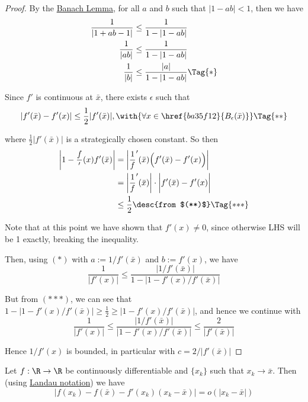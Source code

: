 \begin{proof}
  \def\A{f'(\bar x)}\def\B{f'(x)}

  By the \href{aa9e48d}{Banach Lemma}, for all $a$ and $b$ such that
  $|1-ab|<1$, then we have
  \begin{align*}
    \frac1{|1+ab-1|} &\leq\frac1{1-|1-ab|}            \\
    \frac1{|ab|}     &\leq\frac1{1-|1-ab|}            \\
    \frac1{|b|}      &\leq\frac{|a|}{1-|1-ab|}\Tag{*}
  \end{align*}


  Since $f'$ is continuous at $\bar x$, there exists $\epsilon$ such that
  \begin{equation*}
    |f'(\bar x)-f'(x)|\leq\frac12|f'(\bar x)|,
    \with{\forall x\in\href{ba35f12}{B_\epsilon(\bar x)}}\Tag{**}
  \end{equation*}

  where $\frac12|f'(\bar x)|$ is a strategically chosen constant. So then
  \begin{align*}
    \left|1-\frac\B\A\right| &=\left|\frac1\A\Bigl(\A-\B\Bigr)\right|     \\
                             &=\bigg|\frac1\A\bigg|\cdot\bigg|\A-\B\bigg| \\
                             &\leq\frac12\desc{from $(**)$}\Tag{*{*}*}
  \end{align*}

  Note that at this point we have shown that $f'(x)\neq0$, since otherwise LHS
  will be 1 exactly, breaking the inequality.

  Then, using $(*)$ with $a:=1/f'(\bar x)$ and $b:=f'(x)$, we have
  $$
    \frac{1}{|\B|}\leq\frac{|1/\A|}{1-|1-\B/\A|}
  $$

  But from $(*{*}*)$, we can see that $1-|1-\B/\A|\geq\frac12\geq|1-\B/\A|$,
  and hence we continue with
  $$
    \frac{1}{|\B|}\leq\frac{|1/\A|}{|1-\B/\A|}\leq\frac2{|\A|}
  $$

  Hence $1/\B$ is bounded, in particular with $c=2/|f'(\bar x)|$
\end{proof}

\Lemma{}\label{ca54400}

Let $f:\R\to\R$ be continuously differentiable and $\{x_k\}$ such that
$x_k\to\bar x$. Then (using \href{ab54b3a}{Landau notation}) we have
$$
  |f(x_k)-f(\bar x)-f'(x_k)(x_k-\bar x)|=o(|x_k-\bar x|)
$$

